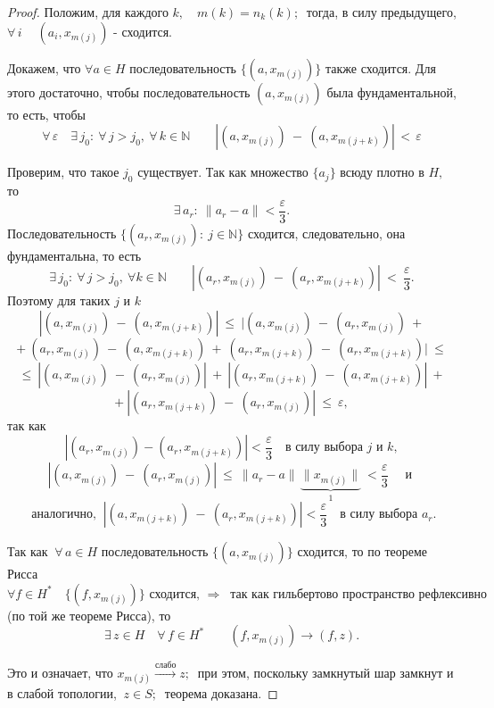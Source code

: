 \documentclass[a4paper]{article}
\begin{document}
\begin{proof}
Положим, для каждого $k, \quad m(k) = n_k (k);\ $ тогда, в силу
предыдущего, $\forall \, i\ \quad  (a_i, x_{m(j)})$ - сходится.

Докажем, что $ \forall a\in H$ последовательность $\{ (a,
x_{m(j)}) \}$ также сходится. Для этого достаточно, чтобы
последовательность $(a, x_{m(j)})$ была фундаментальной, то есть,
чтобы
$$
\forall \, \varepsilon \quad  \exists \, j_0\colon\ \forall\,
j>j_0, \ \forall \, k\in \mathbb{N}\qquad \left| (a, x_{m(j)})\ -
\ (a, x_{m(j+k)})\right| \, < \, \varepsilon
$$

Проверим, что такое $j_0$ существует. Так как множество $\{a_j\}$
всюду плотно в $H,\ $ то
$$
\exists \, a_r\colon \ \|a_r - a\| < \frac{\varepsilon}{3}.
$$
Последовательность $\{(a_r, x_{m(j)})\colon \ j\in \mathbb{N}\}$
сходится, следовательно, она фундаментальна, то есть
$$
\exists \, j_0\colon \ \forall \, j>j_0, \ \forall k\in \mathbb{N}
\qquad \left| (a_r, x_{m(j)})\ - \ (a_r, x_{m(j+k)})\right|\ < \
\frac{\varepsilon}{3}.
$$
Поэтому для таких $j$ и $k$
$$
\left| (a, x_{m(j)})\ - \ (a, x_{m(j+k)})\right| \ \leqslant \ |
(a, x_{m(j)})\ - \ (a_r, x_{m(j)}) \ +
$$
$$
+ \ (a_r, x_{m(j)})\ - \ (a, x_{m(j+k)}) \ + \ (a_r, x_{m(j+k)})\
- \ (a_r, x_{m(j+k)})| \ \leqslant
$$
$$
\leqslant\  \left| (a, x_{m(j)})\ - \ (a_r, x_{m(j)})\right| \ + \
\left| (a_r, x_{m(j + k)})\ - \ (a, x_{m(j+k)})\right| \ +
$$
$$
+ \ \left| (a_r, x_{m(j+k)})\ - \ (a_r, x_{m(j)})\right| \
\leqslant \ \varepsilon,
$$
так как
$$
\left| (a_r, x_{m(j)}) - (a_r, x_{m(j+k)}) \right| <
\frac{\varepsilon}{3} \quad \mbox{в силу выбора $j$ и $k,$}
$$
$$
\left| (a, x_{m(j)})\ - \ (a_r, x_{m(j)})\right| \ \leqslant \
\|a_r - a\| \, \underbrace{\|x_{m(j)}\|}_{1} \ <
\frac{\varepsilon}{3} \quad \mbox{ и }
$$
$$
\mbox{ аналогично, } \ \left| (a, x_{m(j + k)})\ - \ (a_r,
x_{m(j+k)})\right| < \frac{\varepsilon}{3} \quad \mbox{в силу
выбора $a_r.$}
$$

Так как $\ \forall \, a\in H$ последовательность  $\{(a,
x_{m(j)})\}$ сходится, то по теореме Рисса
$$
\forall f\in H^{*} \quad \{(f, x_{m(j)})\} \mbox{ сходится, }
\Rightarrow \ \mbox{ так как гильбертово пространство рефлексивно}
$$
(по той же теореме Рисса), то
$$
\exists \, z\in H \quad \forall \, f\in H^{*} \qquad (f, x_{m(j)})
\rightarrow (f, z).
$$

Это и означает, что $x_{m(j)}
\stackrel{\mbox{слабо}}{\longrightarrow} z;\ $  при этом,
поскольку замкнутый шар замкнут и в слабой топологии, $\ z\in S;\
$ теорема доказана.

\end{proof}
\end{document}
